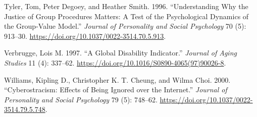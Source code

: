 \documentclass[
  singlecolumn]{report}
\newlength{\cslhangindent}
\newlength{\cslentryspacingunit} %
\newenvironment{CSLReferences}[2] %
 {%
  \setlength{\parindent}{0pt}
  \ifodd #1
  \let\oldpar\par
  \def\par{\hangindent=\cslhangindent\oldpar}
  \fi
  \setlength{\parskip}{#2\cslentryspacingunit}
 }%
 {}
\begin{document}
\begin{CSLReferences}{1}{0}
\leavevmode{}%
Tyler, Tom, Peter Degoey, and Heather Smith. 1996. {``Understanding Why
the Justice of Group Procedures Matters: A Test of the Psychological
Dynamics of the Group-Value Model.''} \emph{Journal of Personality and
Social Psychology} 70 (5): 913--30.
\url{https://doi.org/10.1037/0022-3514.70.5.913}.

\leavevmode{}%
Verbrugge, Lois M. 1997. {``A Global Disability Indicator.''}
\emph{Journal of Aging Studies} 11 (4): 337--62.
\url{https://doi.org/10.1016/S0890-4065(97)90026-8}.

\leavevmode{}%
Williams, Kipling D., Christopher K. T. Cheung, and Wilma Choi. 2000.
{``Cyberostracism: Effects of Being Ignored over the Internet.''}
\emph{Journal of Personality and Social Psychology} 79 (5): 748--62.
\url{https://doi.org/10.1037/0022-3514.79.5.748}.

\end{CSLReferences}
\end{document}
